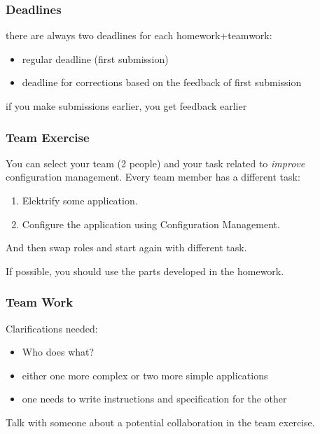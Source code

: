 \begin{frame}
	\frametitle{Deadlines}

	there are always two deadlines for each homework+teamwork:

	\begin{itemize}
	\item regular deadline (first submission)
	\item deadline for corrections based on the feedback of first submission
	\end{itemize}

	if you make submissions earlier, you get feedback earlier
\end{frame}

\begin{frame}
	\frametitle{Team Exercise}
	You can select your team (2 people) and your task related to \emph{improve} configuration management.
	Every team member has a different task:

	\begin{enumerate}
		\item Elektrify some application.
		\item Configure the application using Configuration Management.
	\end{enumerate}

	\vspace{0.5cm}
	And then swap roles and start again with different task.

	\vspace{0.5cm}
	If possible, you should use the parts developed in the homework.
\end{frame}

\begin{frame}
	\frametitle{Team Work}


	Clarifications needed:
	\begin{itemize}
	\item Who does what?
	\item either one more complex or two more simple applications
	\item one needs to write instructions and specification for the other
	\end{itemize}
\end{frame}

\begin{assignment}
	\begin{task}
	Talk with someone about a potential collaboration in the team exercise.
	\end{task}
\end{assignment}


